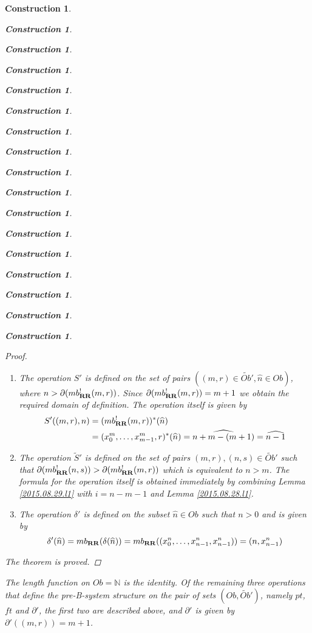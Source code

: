 \documentclass[12pt]{amsart}
\numberwithin{proposition}{subsection}
\newtheorem{construction}[proposition]{Construction}
\newcommand{\nn}{{\mathbb N}}
\newcommand{\nat}{\nn}
\newcommand{\wt}{\widetilde}
\newcommand{\wh}{\widehat}
\newcommand{\RR}{{\bf RR}}
\begin{document}
\begin{construction}
\begin{construction}
\begin{construction}
\begin{construction}
\begin{construction}
\begin{construction}
\begin{construction}
\begin{construction}
\begin{construction}
\begin{construction}
\begin{construction}
\begin{construction}
\begin{construction}
\begin{construction}
\begin{construction}
\begin{construction}
\begin{construction}
\begin{proof}
\begin{enumerate}
  $\partial(mb_{\RR}^!(n,s))>m-1$. Since $\partial(mb_{\RR}^!(n,s))=n+1$ we
  obtain the required domain of definition. The formula by the operation itself
  is obtained immediately by combining Lemma \ref{2015.08.29.l1} and Lemma
  \ref{2015.08.26.l3a}.
%
\item The operation $S'$ is defined on the set of pairs $((m,r)\in
  \wt{Ob}',\wh{n}\in Ob)$, where $n>\partial(mb_{\RR}^!(m,r))$. Since
  $\partial(mb_{\RR}^!(m,r))=m+1$ we obtain the required domain of
  definition. The operation itself is given by
  \begin{equation*}
    \begin{split}
      S'((m,r),n)&=(mb_{\RR}^!(m,r))^*(\wh{n})
      \\&=(x_0^m,\dots,x_{m-1}^m,r)^*(\wh{n})=\wh{n+m-(m+1)}=\wh{n-1}
    \end{split}
  \end{equation*}
\item The operation $\wt{S}'$ is defined on the set of pairs $(m,r),(n,s)\in
  \wt{Ob}'$ such that $\partial(mb_{\RR}^!(n,s))>\partial(mb_{\RR}^!(m,r))$
  which is equivalent to $n>m$. The formula for the operation itself is
  obtained immediately by combining Lemma \ref{2015.08.29.l1} with $i=n-m-1$
  and Lemma \ref{2015.08.28.l1}.
%
\item The operation $\delta'$ is defined on the subset $\wh{n}\in Ob$ such that
  $n>0$ and is given by
%
$$\delta'(\wh{n})=mb_{\RR}(\delta(\wh{n}))=mb_{\RR}((x_0^n,\dots,x_{n-1}^n,x_{n-1}^n))=(n,x_{n-1}^n)$$
%
\end{enumerate}
%
The theorem is proved. 
\end{proof}
%
The length function on $Ob=\nat$ is the identity. Of the remaining three
operations that define the pre-B-system structure on the pair of sets
$(Ob,\wt{Ob}')$, namely $pt$, $ft$ and $\partial'$, the first two are described above,
and $\partial'$ is given by $\partial'((m,r))=m+1$.


\end{construction}
\end{construction}
\end{construction}
\end{construction}
\end{construction}
\end{construction}
\end{construction}
\end{construction}
\end{construction}
\end{construction}
\end{construction}
\end{construction}
\end{construction}
\end{construction}
\end{construction}
\end{construction}
\end{construction}
\end{document}
